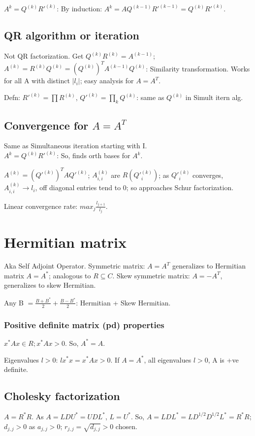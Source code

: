 \documentclass[10pt]{amsart}
\begin{document}
$A^{k} = Q^{(k)}R'^{(k)}$: By induction: $A^{k} = AQ^{(k-1)}R'^{(k-1)} = Q^{(k)}R'^{(k)}$.

\subsection{QR algorithm or iteration}
Not QR factorization. Get $Q^{(k)}R^{(k)} = A^{(k-1)}$; $A^{(k)}=R^{(k)}Q^{(k)} = (Q^{(k)})^{T}A^{(k-1)}Q^{(k)}$: Similarity transformation. Works for all A with distinct $|l_{i}|$; easy analysis for $A=A^{T}$.

Defn: $R'^{(k)} = \prod R^{(k)}$, $Q'^{(k)} = \prod_{k} Q^{(k)}$: same as $Q^{(k)}$ in Simult itern alg.

\subsection{Convergence for $A=A^{T}$}
Same as Simultaneous iteration starting with I. \\
$A^{k} = Q^{(k)}R'^{(k)}$: So, finds orth bases for $A^{k}$.

$A^{(k)} = (Q'^{(k)})^{T}AQ'^{(k)}$; $A^{(k)}_{i,i}$ are $R(Q'^{(k)}_{i})$; as $Q'^{(k)}_{i}$ converges, $A^{(k)}_{i,i} \to l_{i}$, off diagonal entries tend to 0; so approaches Schur factorization.

Linear convergence rate: $max_{j}\frac{l_{j+1}}{l_{j}}$.

\section{Hermitian matrix}
Aka Self Adjoint Operator. Symmetric matrix: $A=A^{T}$ generalizes to Hermitian matrix $A=A^{*}$; analogous to $R \subseteq C$. Skew symmetric matrix: $A= -A^{T}$, generalizes to skew Hermitian.

Any B $ = \frac{B+B^{*}}{2} + \frac{B-B^{*}}{2}$: Hermitian + Skew Hermitian.

\subsubsection{Positive definite matrix (pd) properties}
$x^{*}Ax \in R; x^{*}Ax > 0$. So, $A^{*}=A$.

Eigenvalues $l>0$: $lx^{*}x = x^{*}Ax > 0$. If $A = A^{*}$, all eigenvalues $l>0$, A is +ve definite.

\subsection{Cholesky factorization}
$A = R^{*}R$. As $A = LDU^{*}=UDL^{*}$, $L=U^{*}$. So, $A = LDL^{*} = LD^{1/2}D^{1/2}L^{*} = R^{*}R$; $d_{j,j} > 0$ as $a_{j,j}>0$; $r_{j,j} = \sqrt{d_{j,j}} >0$ chosen.
\end{document}
